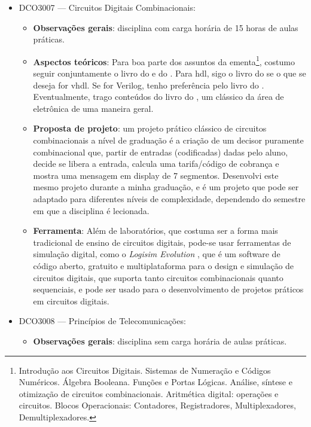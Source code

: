 \documentclass{article}
\begin{document}
\begin{itemize}
    \item DCO3007 --- Circuitos Digitais Combinacionais:
    \begin{itemize}
        \item \textbf{Observações gerais}: disciplina com carga horária de 15 horas de aulas práticas.
        \item \textbf{Aspectos teóricos}: Para boa parte dos assuntos da ementa\footnote{Introdução aos Circuitos Digitais. Sistemas de Numeração e Códigos Numéricos. Álgebra Booleana. Funções e Portas Lógicas. Análise, síntese e otimização de circuitos combinacionais. Aritmética digital: operações e circuitos. Blocos Operacionais: Contadores, Registradores, Multiplexadores, Demultiplexadores.}, costumo seguir conjuntamente o livro do \cite{tocciDigitalSystems2017} e do \cite{vahidDigitalDesignRTL2010}. Para \gls{hdl}, sigo o livro do \textcite{amoreVHDLDescricaoSintese2012} se o que se deseja for \gls{vhdl}. Se for Verilog, tenho preferência pelo livro do \textcite{chuFPGAPrototypingVerilog2008}.  Eventualmente, trago conteúdos do livro do \textcite{hillArtElectronics2024}, um clássico da área de eletrônica de uma maneira geral.
        \item \textbf{Proposta de projeto}: um projeto prático clássico de circuitos combinacionais a nível de graduação é a criação de um decisor puramente combinacional que, partir de entradas (codificadas) dadas pelo aluno, decide se libera a entrada, calcula uma tarifa/código de cobrança e mostra uma mensagem em display de 7 segmentos. Desenvolvi este mesmo projeto durante a minha graduação, e é um projeto que pode ser adaptado para diferentes níveis de complexidade, dependendo do semestre em que a disciplina é lecionada.
        \item \textbf{Ferramenta}: Além de laboratórios, que costuma ser a forma mais tradicional de ensino de circuitos digitais, pode-se usar ferramentas de simulação digital, como o \textit{Logisim Evolution} \cite{burchLogisimevolution2024}, que é um software de código aberto, gratuito e multiplataforma para o design e simulação de circuitos digitais, que suporta tanto circuitos combinacionais quanto sequenciais, e pode ser usado para o desenvolvimento de projetos práticos em circuitos digitais.
    \end{itemize}
    \item DCO3008 --- Princípios de Telecomunicações:
    \begin{itemize}
        \item \textbf{Observações gerais}: disciplina sem carga horária de aulas práticas.

\end{itemize}
\end{itemize}
\end{document}
